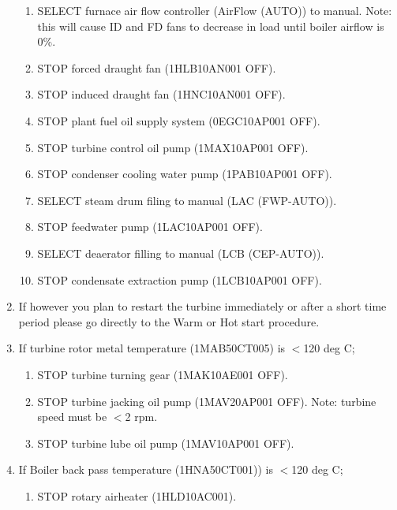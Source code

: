 \documentclass[10pt,a4paper]{article}
\begin{document}
\begin{enumerate}
\begin{enumerate}
\item SELECT furnace air flow controller (AirFlow (AUTO)) to manual. Note: this will cause ID and FD fans to decrease in load until boiler airflow is 0\%.
\item STOP forced draught fan (1HLB10AN001 OFF).
\item STOP induced draught fan (1HNC10AN001 OFF).

\item STOP plant fuel oil supply system (0EGC10AP001 OFF).
\item STOP turbine control oil pump (1MAX10AP001 OFF).
\item STOP condenser cooling water pump (1PAB10AP001 OFF).
\item SELECT steam drum filing to manual (LAC (FWP-AUTO)).
\item STOP feedwater pump (1LAC10AP001 OFF).
\item SELECT deaerator filling to manual (LCB (CEP-AUTO)).
\item STOP condensate extraction pump (1LCB10AP001 OFF).
\end{enumerate}
\item If however you plan to restart the turbine immediately or after a short time period please go directly to the Warm or Hot start procedure.
\item If turbine rotor metal temperature (1MAB50CT005) is $<$120 deg C;
\begin{enumerate}
\item STOP turbine turning gear (1MAK10AE001 OFF).
\item STOP turbine jacking oil pump (1MAV20AP001 OFF). Note: turbine speed must be $<$2 rpm.
\item STOP turbine lube oil pump (1MAV10AP001 OFF).
\end{enumerate}
\item If Boiler back pass temperature (1HNA50CT001)) is $<$120 deg C; 
\begin{enumerate}
\item STOP rotary airheater (1HLD10AC001).
\end{enumerate}
\end{enumerate}


\vspace*{2cm}
\end{document}
